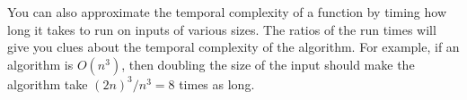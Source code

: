 You can also approximate the temporal complexity of a function by timing how long it takes to run on inputs of various sizes. The ratios of the run times will give you clues about the temporal complexity of the algorithm. For example, if an algorithm is $O(n^3)$, then doubling the size of the input should make the algorithm take $(2n)^3/n^3=8$ times as long.

